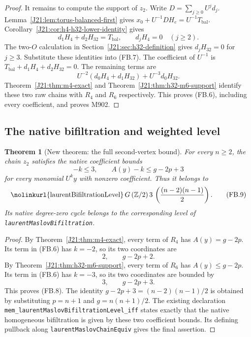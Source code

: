 \documentclass[11pt,oneside]{report}
\newtheorem{theorem}{Theorem}[section]
\theoremstyle{definition}
\numberwithin{equation}{section}
\newcommand{\decl}[1]{\textnormal{\nolinkurl{#1}}}
\begin{document}
\begin{proof}
It remains to compute the support of $z_2$.
Write $D=\sum_{j\geq0}U^j d_j$.
Lemma~\ref{J21:lem:torus-balanced-first} gives
$x_0+U^{-1}D H_e=U^{-1}T_{\mathrm{bal}}$.
Corollary~\ref{J21:cor:h4-h32-lower-identity} gives
\[
 d_1H_4+d_2H_{32}=T_{\mathrm{bal}},\qquad d_jH_4=0\quad(j\geq2).
\]
The two-$O$ calculation in Section~\ref{J21:sec:h32-definition} gives
$d_jH_{32}=0$ for $j\geq3$.
Substitute these identities into (FB.7).
The coefficient of $U^{-1}$ is
$T_{\mathrm{bal}}+d_1H_4+d_2H_{32}=0$.
The remaining terms are
\[
             U^{-2}(d_0H_4+d_1H_{32})+U^{-3}d_0H_{32}.
\]
Theorem~\ref{J21:thm:m4-exact} and
Theorem~\ref{J21:thm:h32-m6-support} identify these two raw chains
with $R_4$ and $R_6$ respectively.
This proves (FB.6), including every coefficient, and proves M902.
\end{proof}

\subsection{The native bifiltration and weighted level}

\begin{theorem}[New theorem: the full second-vertex bound]
\label{J21:thm:torus-second-bifiltration}
For every $n\geq2$, the chain $z_2$ satisfies the native coefficient
bounds
\[
                -k\leq3,\qquad
                A(y)-k\leq g-2p+3
 \tag{FB.8}
\]
for every monomial $U^k y$ with nonzero coefficient.
Thus it belongs to
\[
 \decl{laurentBifiltrationLevel}\,G\,(\mathbb Z/2)\,
       3\,\left(\frac{(n-2)(n-1)}2\right).
 \tag{FB.9}
\]
Its native degree-zero cycle belongs to the corresponding level of
\decl{laurentMaslovBifiltration}.
\end{theorem}
\begin{proof}
By Theorem~\ref{J21:thm:m4-exact}, every term of $R_4$ has
$A(y)=g-2p$.
Its term in (FB.6) has $k=-2$, so its two coordinates are
\[
                           2,\qquad g-2p+2.
\]
By Theorem~\ref{J21:thm:h32-m6-support}, every term of $R_6$ has
$A(y)\leq g-2p$.
Its term in (FB.6) has $k=-3$, so its two coordinates are bounded
by
\[
                           3,\qquad g-2p+3.
\]
This proves (FB.8).
The identity
$g-2p+3=(n-2)(n-1)/2$ is obtained by substituting
$p=n+1$ and $g=n(n+1)/2$.
The existing declaration
\decl{mem_laurentMaslovBifiltrationLevel_iff}
states exactly that the native homogeneous bifiltration is given
by these two coefficient bounds.
Its defining pullback along \decl{laurentMaslovChainEquiv} gives
the final assertion.
\end{proof}
\end{document}
